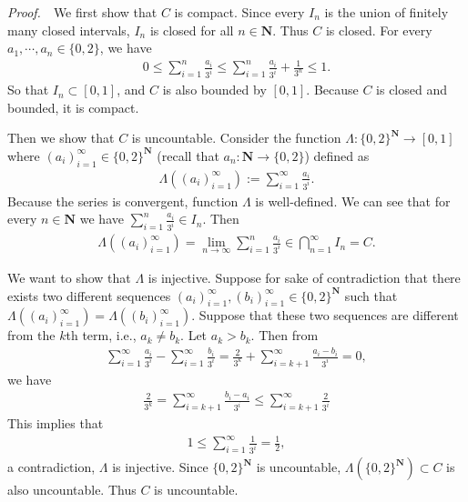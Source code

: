 \documentclass{book}
\theoremstyle{defstyle}
\theoremstyle{thmstyle}
\newcommand{\pff}{\noindent\emph{Proof.}~~}
\begin{document}
\pff We first show that $C$ is compact. Since every $I_n$ is the union of finitely many closed intervals, $I_n$ is closed for all $n \in \mathbf{N}$. Thus $C$ is closed. For every $a_1, \cdots, a_n \in \{0, 2\}$, we have
    \begin{align*}
        0
        \leq \sum_{i = 1}^{n}\frac{a_i}{3^i}
        \leq \sum_{i = 1}^{n}\frac{a_i}{3^i} + \frac{1}{3^n}
        \leq 1.
    \end{align*}
So that $I_n \subset [0, 1]$, and $C$ is also bounded by $[0, 1]$. Because $C$ is closed and bounded, it is compact.

Then we show that $C$ is uncountable. Consider the function $\Lambda : \{0, 2\}^{\mathbf{N}} \to [0, 1]$ where $(a_i)_{i = 1}^{\infty} \in \{0, 2\}^{\mathbf{N}}$ (recall that $a_n : \mathbf{N} \to \{0, 2\}$) defined as
    \begin{align*}
        \Lambda((a_i)_{i = 1}^{\infty}) := \sum_{i = 1}^{\infty}\frac{a_i}{3^i}.
    \end{align*}
Because the series is convergent, function $\Lambda$ is well-defined. We can see that for every $n \in \mathbf{N}$ we have $\sum_{i = 1}^{n}\frac{a_i}{3^i} \in I_n$. Then
    \begin{align*}
        \Lambda((a_i)_{i = 1}^{\infty}) = \lim_{n \to \infty} \sum_{i = 1}^{n}\frac{a_i}{3^i} \in \bigcap_{n = 1}^{\infty}I_n = C.
    \end{align*}

We want to show that $\Lambda$ is injective. Suppose for sake of contradiction that there exists two different sequences $(a_i)_{i = 1}^{\infty}, (b_i)_{i = 1}^{\infty} \in \{0, 2\}^{\mathbf{N}}$ such that $\Lambda((a_i)_{i = 1}^{\infty}) = \Lambda((b_i)_{i = 1}^{\infty})$. Suppose that these two sequences are different from the $k$th term, i.e., $a_k \neq b_k$. Let $a_k > b_k$. Then from
    \begin{align*}
        \sum_{i = 1}^{\infty}\frac{a_i}{3^i} - \sum_{i = 1}^{\infty}\frac{b_i}{3^i}
        = \frac{2}{3^k} + \sum_{i = k + 1}^{\infty}\frac{a_i - b_i}{3^i}
        = 0,
    \end{align*}
we have
    \begin{align*}
        \frac{2}{3^k}
        = \sum_{i = k + 1}^{\infty}\frac{b_i - a_i}{3^i}
        \leq \sum_{i = k + 1}^{\infty}\frac{2}{3^i}
    \end{align*}
This implies that
    \begin{align*}
        1 \leq \sum_{i = 1}^{\infty}\frac{1}{3^i} = \frac{1}{2},
    \end{align*}
a contradiction, $\Lambda$ is injective. Since $\{0, 2\}^{\mathbf{N}}$ is uncountable, $\Lambda(\{0, 2\}^{\mathbf{N}}) \subset C$ is also uncountable. Thus $C$ is uncountable.
\end{document}

